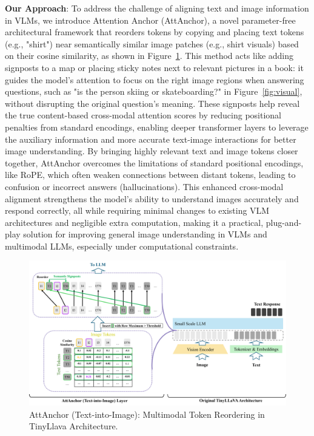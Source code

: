 \documentclass[11pt]{article}
\begin{document}
\textbf{Our Approach}: To address the challenge of aligning text and image information in VLMs, we introduce Attention Anchor (AttAnchor), a novel parameter-free architectural framework that reorders tokens by copying and placing text tokens (e.g., "shirt") near semantically similar image patches (e.g., shirt visuals) based on their cosine similarity, as shown in Figure~\ref{fig:attanchor}. This method acts like adding signposts to a map or placing sticky notes next to relevant pictures in a book: it guides the model’s attention to focus on the right image regions when answering questions, such as "is the person skiing or skateboarding?" in Figure~\ref{fig:visual}, without disrupting the original question’s meaning. These signposts help reveal the true content-based cross-modal attention scores by reducing positional penalties from standard encodings, enabling deeper transformer layers to leverage the auxiliary information and more accurate text-image interactions for better image understanding. By bringing highly relevant text and image tokens closer together, AttAnchor overcomes the limitations of standard positional encodings, like RoPE, which often weaken connections between distant tokens, leading to confusion or incorrect answers (hallucinations). This enhanced cross-modal alignment strengthens the model’s ability to understand images accurately and respond correctly, all while requiring minimal changes to existing VLM architectures and negligible extra computation, making it a practical, plug-and-play solution for improving general image understanding in VLMs and multimodal LLMs, especially under computational constraints. 



\begin{figure}[H]
    \centering
    \includegraphics[width=\linewidth]{iclr2026/Attanchor_arch.png}
    \caption{AttAnchor (Text-into-Image): Multimodal Token Reordering in TinyLlava Architecture.}
    \label{fig:attanchor}
\end{figure}
\end{document}

